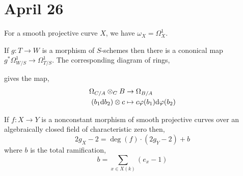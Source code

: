 \documentclass[12pt]{article}
\begin{document}
\section{April 26}

\begin{theorem}
For a smooth projective curve $X$, we have $\omega_X = \Omega^1_X$.
\end{theorem}

\begin{theorem}
If $g : T \to W$ is a morphism of $S$-schemes then there is a cononical map $g^* \Omega_{W/S}^1 \to \Omega^1_{T/S}$. The corresponding diagram of rings,
\begin{center}
\end{center}
gives the map,
\begin{align*}
\Omega_{C/A} \otimes_C B & \to \Omega_{B/A}
\\
(b_1 \mathrm{d}{b_2}) \otimes c & \mapsto c \varphi(b_1) \mathrm{d}{\varphi(b_2)} 
\end{align*}
\end{theorem}

\begin{theorem}
If $f : X \to Y$ is a nonconstant morphism of smooth projective curves  over an algebraically closed field of characteristic zero then,
\[ 2 g_X - 2 = \deg{(f)} \cdot (2 g_Y - 2) + b \]
where $b$ is the total ramification,
\[ b = \sum_{x \in X(k)} (e_x - 1) \]
\end{theorem}
\end{document}
